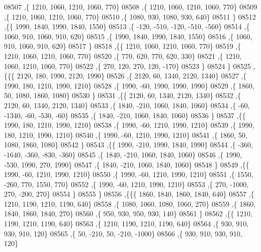 \begin{DoxyCode}
08507     ,\{  1210,  1060,  1210,  1060,   770\}
08508     ,\{  1210,  1060,  1210,  1060,   770\}
08509     ,\{  1210,  1060,  1210,  1060,   770\}
08510     ,\{  1080,   930,  1080,   930,   640\}
08511     \}
08512    ,\{\{  1990,  1840,  1990,  1840,  1550\}
08513     ,\{  -120,  -510,  -120,  -510,  -560\}
08514     ,\{  1060,   910,  1060,   910,   620\}
08515     ,\{  1990,  1840,  1990,  1840,  1550\}
08516     ,\{  1060,   910,  1060,   910,   620\}
08517     \}
08518    ,\{\{  1210,  1060,  1210,  1060,   770\}
08519     ,\{  1210,  1060,  1210,  1060,   770\}
08520     ,\{   770,   620,   770,   620,   330\}
08521     ,\{  1210,  1060,  1210,  1060,   770\}
08522     ,\{   270,   120,   270,   120,  -170\}
08523     \}
08524    \}
08525   ,\{\{\{  2120,   180,  1990,  2120,  1990\}
08526     ,\{  2120,    60,  1340,  2120,  1340\}
08527     ,\{  1990,   180,  1210,  1990,  1210\}
08528     ,\{  1990,   -60,  1990,  1990,  1990\}
08529     ,\{  1860,    50,  1080,  1860,  1080\}
08530     \}
08531    ,\{\{  2120,    60,  1340,  2120,  1340\}
08532     ,\{  2120,    60,  1340,  2120,  1340\}
08533     ,\{  1840,  -210,  1060,  1840,  1060\}
08534     ,\{   -60, -1340,   -60,  -530,   -60\}
08535     ,\{  1840,  -210,  1060,  1840,  1060\}
08536     \}
08537    ,\{\{  1990,   180,  1210,  1990,  1210\}
08538     ,\{  1990,   -60,  1210,  1990,  1210\}
08539     ,\{  1990,   180,  1210,  1990,  1210\}
08540     ,\{  1990,   -60,  1210,  1990,  1210\}
08541     ,\{  1860,    50,  1080,  1860,  1080\}
08542     \}
08543    ,\{\{  1990,  -210,  1990,  1840,  1990\}
08544     ,\{  -360, -1640,  -360,  -830,  -360\}
08545     ,\{  1840,  -210,  1060,  1840,  1060\}
08546     ,\{  1990,  -530,  1990,   270,  1990\}
08547     ,\{  1840,  -210,  1060,  1840,  1060\}
08548     \}
08549    ,\{\{  1990,   -60,  1210,  1990,  1210\}
08550     ,\{  1990,   -60,  1210,  1990,  1210\}
08551     ,\{  1550,  -260,   770,  1550,   770\}
08552     ,\{  1990,   -60,  1210,  1990,  1210\}
08553     ,\{   270, -1000,   270,  -200,   270\}
08554     \}
08555    \}
08556   ,\{\{\{  1860,  1840,  1860,  1840,   640\}
08557     ,\{  1210,  1190,  1210,  1190,   640\}
08558     ,\{  1080,  1060,  1080,  1060,   270\}
08559     ,\{  1860,  1840,  1860,  1840,   270\}
08560     ,\{   950,   930,   950,   930,   140\}
08561     \}
08562    ,\{\{  1210,  1190,  1210,  1190,   640\}
08563     ,\{  1210,  1190,  1210,  1190,   640\}
08564     ,\{   930,   910,   930,   910,   120\}
08565     ,\{    50,  -210,    50,  -210, -1000\}
08566     ,\{   930,   910,   930,   910,   120\}

\end{DoxyCode}
